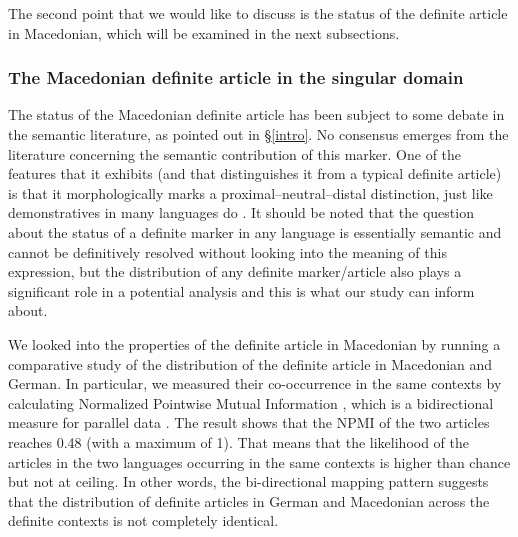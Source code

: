 \documentclass[output=paper,colorlinks,citecolor=brown]{langscibook}
\begin{document}
The second point that we would like to discuss is the status of the definite article in Macedonian, which will be examined in the next subsections. 


\subsubsection{The Macedonian definite article in the singular domain} \label{McDef}

The status of the Macedonian definite article has been subject to some debate in the semantic literature, as pointed out in \S \ref{intro}. No consensus emerges from the literature concerning the semantic contribution of this marker. One of the features that it exhibits (and that distinguishes it from a typical definite article) is that it morphologically marks a proximal--neutral--distal distinction, just like demonstratives in many languages do \citep{Lyons1999}. It should be noted that the question about the status of a definite marker in any language is essentially semantic and cannot be definitively resolved without looking into the meaning of this expression, but the distribution of any definite marker/article also plays a significant role in a potential analysis and this is what our study can inform about.   

We looked into the properties of the definite article in Macedonian by running a comparative study of the distribution of the definite article in Macedonian and German. In particular, we measured their co-occurrence in the same contexts by calculating Normalized Pointwise Mutual Information \citep[NMPI,][]{Bouma2009}, which is a bidirectional measure for parallel data \citep{LeBruyn.et.al2022a}. The result shows that the NPMI of the two articles reaches 0.48 (with a maximum of 1). That means that the likelihood of the articles in the two languages occurring in the same contexts is higher than chance but not at ceiling. In other words, the bi-directional mapping pattern suggests that the distribution of definite articles in German and Macedonian across the definite contexts is not completely identical. 
\end{document}
